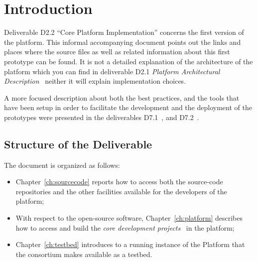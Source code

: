 \documentclass{learnpad}
\begin{document}


\mainmatter


\chapter{Introduction}
\label{ch:intro}

Deliverable D2.2 ``Core Platform Implementation'' concerns the first version of the \learnpad platform.
This informal accompanying document points out the links and places where the source files as well as related
information about this first prototype can be found.  It is not a detailed explanation of the
architecture of the platform which you can find in deliverable D2.1
\emph{Platform Architectural Description}~\cite{learnpad:D2.1} neither it will 
explain implementation choices.

A more focused description about both the best practices, and the tools 
that have been setup in order to facilitate the development and the deployment 
of the \learnpad prototypes were presented in the deliverables 
D7.1~\cite{learnpad:D7.1}, and D7.2~\cite{learnpad:D7.2}.

\section{Structure of the Deliverable}
\label{sec:structure}

The document is organized as follows:
\begin{itemize}
 \item Chapter~\ref{ch:sourcecode} reports how to access both the 
source-code repositories and the other facilities available for the developers 
of the \learnpad platform;
 \item With respect to the open-source software, Chapter~\ref{ch:platform} 
describes how to access and build the \textit{core development 
projects}~\cite{learnpad:D7.1} in the platform;
 \item Chapter~\ref{ch:testbed} introduces to a running instance of the 
\learnpad Platform that the consortium makes available as a testbed.
\end{itemize}
\end{document}
